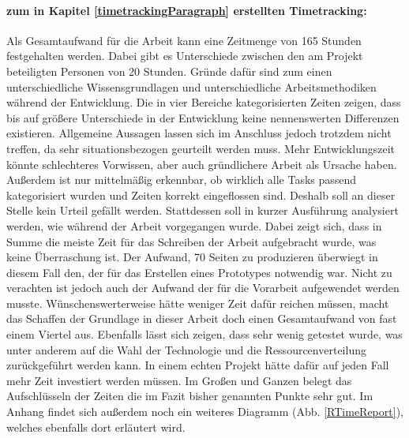 \paragraph{zum in Kapitel \ref{timetrackingParagraph} erstellten Timetracking:} Als Gesamtaufwand für die Arbeit kann eine Zeitmenge von 165 Stunden festgehalten werden. Dabei gibt es Unterschiede zwischen den am Projekt beteiligten Personen von 20 Stunden. Gründe dafür sind zum einen unterschiedliche Wissensgrundlagen und unterschiedliche Arbeitsmethodiken während der Entwicklung. Die in vier Bereiche kategorisierten Zeiten zeigen, dass bis auf größere Unterschiede in der Entwicklung keine nennenswerten Differenzen existieren. Allgemeine Aussagen lassen sich im Anschluss jedoch trotzdem nicht treffen, da sehr situationsbezogen geurteilt werden muss. Mehr Entwicklungszeit könnte schlechteres Vorwissen, aber auch gründlichere Arbeit als Ursache haben. Außerdem ist nur mittelmäßig erkennbar, ob wirklich alle Tasks passend kategorisiert wurden und Zeiten korrekt eingeflossen sind. Deshalb soll an dieser Stelle kein Urteil gefällt werden. Stattdessen soll in kurzer Ausführung analysiert werden, wie während der Arbeit vorgegangen wurde. Dabei zeigt sich, dass in Summe die meiste Zeit für das Schreiben der Arbeit aufgebracht wurde, was keine Überraschung ist. Der Aufwand, 70 Seiten zu produzieren überwiegt in diesem Fall den, der für das Erstellen eines Prototypes notwendig war. Nicht zu verachten ist jedoch auch der Aufwand der für die Vorarbeit aufgewendet werden musste. Wünschenswerterweise  hätte weniger Zeit dafür reichen müssen, macht das Schaffen der Grundlage in dieser Arbeit doch einen Gesamtaufwand von fast einem Viertel aus. Ebenfalls lässt sich zeigen, dass sehr wenig getestet wurde, was unter anderem auf die Wahl der Technologie und die Ressourcenverteilung zurückgeführt werden kann. In einem echten Projekt hätte dafür auf jeden Fall mehr Zeit investiert werden müssen. Im Großen und Ganzen belegt das Aufschlüsseln der Zeiten die im Fazit bisher genannten Punkte sehr gut. Im Anhang findet sich außerdem noch ein weiteres Diagramm (Abb. \ref{RTimeReport}), welches ebenfalls dort erläutert wird.

